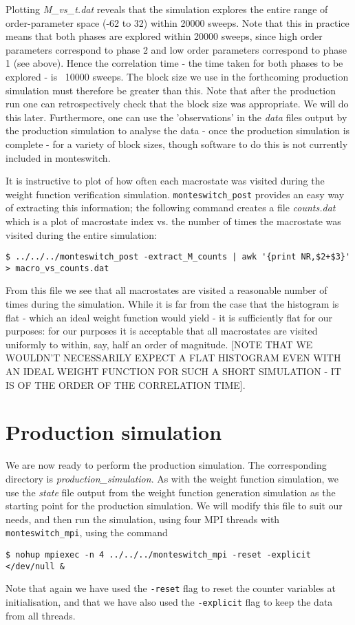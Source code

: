 \documentclass{report}
\begin{document}
Plotting \emph{M\_vs\_t.dat} reveals that the simulation explores the entire range of order-parameter space (-62 to 32) within 20000 sweeps. Note that this
in practice means that both phases are explored within 20000 sweeps, since high order parameters correspond to phase 2 and low order parameters correspond
to phase 1 (see above). Hence the correlation time - the time taken for both phases to be explored - is ~10000 sweeps. The block size we use in the
forthcoming production simulation must therefore be greater than this. Note that after the production run one can retrospectively check that the
block size was appropriate. We will do this later. Furthermore, one can use the 'observations' in the \emph{data} files output by the production simulation to
analyse the data - once the production simulation is complete - for a variety of block sizes, though software to do this is not currently included in
monteswitch.

It is instructive to plot of how often each macrostate was visited during the weight function verification simulation. \texttt{monteswitch\_post}
provides an easy way of extracting this information; the following command creates a file \emph{counts.dat} which is a plot of macrostate index vs. the
number of times the  macrostate was visited during the entire simulation:
\begin{verbatim}
$ ../../../monteswitch_post -extract_M_counts | awk '{print NR,$2+$3}' > macro_vs_counts.dat
\end{verbatim}
From this file we see that all macrostates are visited a reasonable number of times during the simulation. While it is far from the case that the
histogram is flat - which an ideal weight function would yield - it is sufficiently flat for our purposes: for our purposes it is acceptable that
all macrostates are visited uniformly to within, say, half an order of magnitude. [NOTE THAT WE WOULDN'T NECESSARILY EXPECT A FLAT HISTOGRAM EVEN
WITH AN IDEAL WEIGHT FUNCTION FOR SUCH A SHORT SIMULATION - IT IS OF THE ORDER OF THE CORRELATION TIME].


\section{Production simulation}
We are now ready to perform the production simulation. The corresponding directory is \emph{production\_simulation}.
As with the weight function simulation, we use the \emph{state} file output from the weight function generation simulation as the starting point
for the production simulation. We will modify this file to suit our needs, and then run the simulation, using four MPI threads with \texttt{monteswitch\_mpi},
using the command
\begin{verbatim}
$ nohup mpiexec -n 4 ../../../monteswitch_mpi -reset -explicit </dev/null &
\end{verbatim}
Note that again we have used the \texttt{-reset} flag to reset the counter variables at initialisation, and that we have also used the \texttt{-explicit}
flag to keep the data from all threads.
\end{document}
